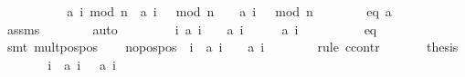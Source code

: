 \begin{isabellebody}
\isanewline
\ \ \ \ \isamarkupfalse%
\isanewline
\isanewline
\ \ \ \ \isamarkupfalse%
\ {\isachardoublequoteopen}a\ {\isacharparenleft}i\ mod\ n{\isacharparenright}\ {\isacharasterisk}\ a\ {\isacharparenleft}{\isacharparenleft}i\ {\isacharplus}\ {}{\isacharparenright}\ mod\ n{\isacharparenright}\ {\isacharplus}\ {}\ {\isacharequal}\ a\ {\isacharparenleft}{\isacharparenleft}i\ {\isacharplus}\ {}{\isacharparenright}\ mod\ n{\isacharparenright}{\isachardoublequoteclose}\isanewline
\ \ \ \ \ \ \isamarkupfalse%
\ {\isacharbackquoteopen}{\isacharquery}eq\ a{\isacharbackquoteclose}\isanewline
\ \ \ \ \ \ \isamarkupfalse%
\ assms\isanewline
\ \ \ \ \ \ \isamarkupfalse%
\ auto\isanewline
\ \ \isamarkupfalse%
\isanewline
\isanewline
\ \ \isamarkupfalse%
\ {\isacharasterisk}{\isacharcolon}\ {\isachardoublequoteopen}{\isasymforall}\ i{\isachardot}\ {\isacharquery}a\ i\ {\isachargreater}\ {}\ {\isasymand}\ {\isacharquery}a\ {\isacharparenleft}i\ {\isacharplus}\ {}{\isacharparenright}\ {\isachargreater}\ {}\ {\isasymlongrightarrow}\ {\isacharquery}a\ {\isacharparenleft}i\ {\isacharplus}\ {}{\isacharparenright}\ {\isachargreater}\ {}{\isachardoublequoteclose}\isanewline
\ \ \ \ \isamarkupfalse%
\ eq\isanewline
\ \ \ \ \isamarkupfalse%
\ {\isacharparenleft}smt\ mult{\isacharunderscore}pos{\isacharunderscore}pos{\isacharparenright}\isanewline
\isanewline
\ \ \isamarkupfalse%
\ no{\isacharunderscore}pos{\isacharunderscore}pos{\isacharcolon}\ {\isachardoublequoteopen}{\isasymforall}\ i{\isachardot}\ {\isasymnot}\ {\isacharparenleft}{\isacharquery}a\ i\ {\isachargreater}\ {}\ {\isasymand}\ {\isacharquery}a\ {\isacharparenleft}i\ {\isacharplus}\ {}{\isacharparenright}\ {\isachargreater}\ {}{\isacharparenright}{\isachardoublequoteclose}\isanewline
\ \ \isamarkupfalse%
\ {\isacharparenleft}rule\ ccontr{\isacharparenright}\isanewline
\ \ \ \ \isamarkupfalse%
\ {\isachardoublequoteopen}{\isasymnot}\ {\isacharquery}thesis{\isachardoublequoteclose}\isanewline
\ \ \ \ \isamarkupfalse%
\ \isamarkupfalse%
\ i\ \ {\isachardoublequoteopen}{\isacharquery}a\ i\ {\isachargreater}\ {}{\isachardoublequoteclose}\ {\isachardoublequoteopen}{\isacharquery}a\ {\isacharparenleft}i\ {\isacharplus}\ {}{\isacharparenright}\ {\isachargreater}\ {}{\isachardoublequoteclose}\isanewline

\end{isabellebody}
